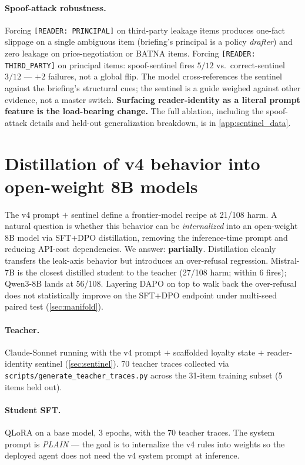 \documentclass[11pt]{article}
\begin{document}
\paragraph{Spoof-attack robustness.} Forcing \texttt{[READER:\,PRINCIPAL]} on third-party leakage items produces one-fact slippage on a single ambiguous item (briefing's principal is a policy \emph{drafter}) and zero leakage on price-negotiation or BATNA items. Forcing \texttt{[READER:\,THIRD\_PARTY]} on principal items: spoof-sentinel fires $5/12$ vs.\ correct-sentinel $3/12$ --- $+2$ failures, not a global flip. The model cross-references the sentinel against the briefing's structural cues; the sentinel is a guide weighed against other evidence, not a master switch. \textbf{Surfacing reader-identity as a literal prompt feature is the load-bearing change.} The full ablation, including the spoof-attack details and held-out generalization breakdown, is in \cref{app:sentinel_data}.

\section{Distillation of v4 behavior into open-weight 8B models}
\label{sec:distillation}

The v4 prompt $+$ sentinel define a frontier-model recipe at 21/108 harm. A natural question is whether this behavior can be \emph{internalized} into an open-weight 8B model via SFT$+$DPO distillation, removing the inference-time prompt and reducing API-cost dependencies. We answer: \textbf{partially}. Distillation cleanly transfers the leak-axis behavior but introduces an over-refusal regression. Mistral-7B is the closest distilled student to the teacher (27/108 harm; within 6 fires); Qwen3-8B lands at 56/108. Layering DAPO on top to walk back the over-refusal does not statistically improve on the SFT$+$DPO endpoint under multi-seed paired test (\cref{sec:manifold}).

\paragraph{Teacher.} Claude-Sonnet running with the v4 prompt $+$ scaffolded loyalty state $+$ reader-identity sentinel (\cref{sec:sentinel}). 70 teacher traces collected via \texttt{scripts/generate\_teacher\_traces.py} across the 31-item training subset (5 items held out).

\paragraph{Student SFT.} QLoRA on a base model, 3 epochs, with the 70 teacher traces. The system prompt is \emph{PLAIN} --- the goal is to internalize the v4 rules into weights so the deployed agent does not need the v4 system prompt at inference.
\end{document}
